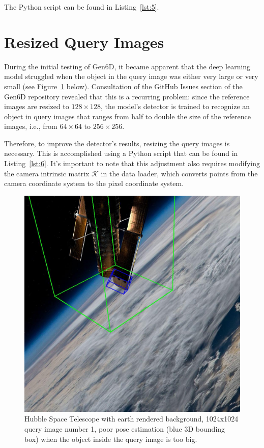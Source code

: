 \bigskip

The Python script can be found in Listing~\ref{lst:5}.

\section{Resized Query Images}

During the initial testing of Gen6D, it became apparent that the deep learning model struggled when the object in the query image was either very large or very small (see Figure~\ref{fig:fig2} below). Consultation of the GitHub Issues section of the Gen6D repository revealed that this is a recurring problem: since the reference images are resized to $128\times 128$, the model's detector is trained to recognize an object in query images that ranges from half to double the size of the reference images, i.e., from $64\times 64$ to $256\times 256$.

\bigskip

Therefore, to improve the detector's results, resizing the query images is necessary. This is accomplished using a Python script that can be found in Listing~\ref{lst:6}. It's important to note that this adjustment also requires modifying the camera intrinsic matrix $\bm{\mathcal{K}}$ in the data loader, which converts points from the camera coordinate system to the pixel coordinate system.

\begin{figure}[h]
    \centering
    \includegraphics[width=0.70\linewidth]{data/fig2.jpg} %
    \caption{Hubble Space Telescope with earth rendered background, 1024x1024 query image number 1, poor pose estimation (blue 3D bounding box) when the object inside the query image is too big.}
    \label{fig:fig2}
\end{figure}

